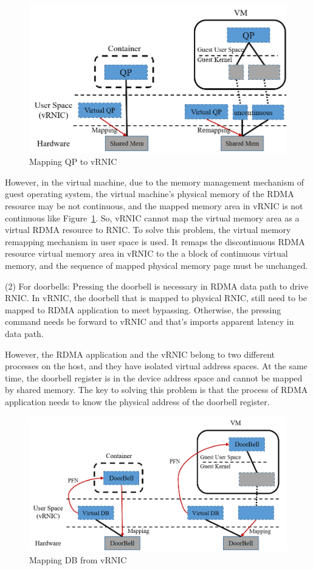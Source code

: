 \begin{figure}[!ht]
	\centering
	\includegraphics[width=1.0\linewidth]{images/zero-copy}
	\caption{Mapping QP to vRNIC}
	\label{fig:zero-copy}
\end{figure}

However, in the virtual machine, due to the memory management mechanism of guest operating system, the virtual machine's physical memory of the RDMA resource may be not continuous, and the mapped memory area in vRNIC is not continuous like Figure~\ref{fig:zero-copy}. So, vRNIC cannot map the virtual memory area as a virtual RDMA resource to RNIC. To solve this problem, the virtual memory remapping mechanism in user space is used. It remaps the discontinuous RDMA resource virtual memory area in vRNIC to the a block of continuous virtual memory, and the sequence of mapped physical memory page must be unchanged.

(2) For doorbells: Pressing the doorbell is necessary in RDMA data path to drive RNIC. In vRNIC, the doorbell that is mapped to physical RNIC, still need to be mapped to RDMA application to meet bypassing. Otherwise, the pressing command needs be forward to vRNIC and that’s imports apparent latency in data path.

However, the RDMA application and the vRNIC belong to two different processes on the host, and they have isolated virtual address spaces. At the same time, the doorbell register is in the device address space and cannot be mapped by shared memory. The key to solving this problem is that the process of RDMA application needs to know the physical address of the doorbell register.

\begin{figure}[!ht]
	\centering
	\includegraphics[width=1.0\linewidth]{images/by-pass}
	\caption{Mapping DB from vRNIC}
	\label{fig:by-pass}
\end{figure}

